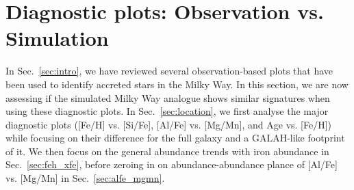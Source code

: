 \documentclass[fleqn,usenatbib]{mnras}
\begin{document}

\section{Diagnostic plots: Observation vs. Simulation}
\label{sec:comparison}

In Sec.~\ref{sec:intro}, we have reviewed several observation-based plots that have been used to identify accreted stars in the Milky Way. In this section, we are now assessing if the simulated Milky Way analogue shows similar signatures when using these diagnostic plots. In Sec.~\ref{sec:location}, we first analyse the major diagnostic plots ([Fe/H] vs. [Si/Fe], [Al/Fe] vs. [Mg/Mn], and Age vs. [Fe/H]) while focusing on their difference for the full galaxy and a GALAH-like footprint of it. We then focus on the general abundance trends with iron abundance in Sec.~\ref{sec:feh_xfe}, before zeroing in on abundance-abundance plance of [Al/Fe] vs. [Mg/Mn] in Sec.~\ref{sec:alfe_mgmn}.
\end{document}
